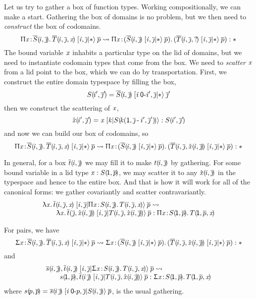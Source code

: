 \documentclass{article}
\begin{document}
Let us try to gather a box of function types. Working compositionally, we can make a
start. Gathering the box of domains is no problem, but we then need to \emph{construct}
the box of codomains.
\[
\xp{\vi,\jj}{\TY}{\PI\vx{\myv S\sv{\vi,\jj}}\myv T\sv{\vi,\jj,\vx}}\:\myv p \leadsto
  \PI\vx{(\xp{\vi,\jj}{\TY}{\myv S\sv{\vi,\jj}}\:\myv p)}
         (\xp{\vi,\jj}{\TY}{\myv T\sv{\vi,\jj,?}}\:\myv p) : \TY
\]
The bound variable $\vx$ inhabits a particular type on the lid of domains,
but we need to instantiate codomain types that come from the box. We need
to \emph{scatter} $\vx$ from a lid point to the box, which we can do by
transportation. First, we construct the entire domain typespace by filling
the box,
\[
S\sv{\vi',\jj'} = \xp{\vi\:\ra\pze\vi',\jj}{\TY}{\myv S\sv{\vi,\jj}}\:\jj'
\]
then we construct the scattering of $\vx$,
\[
\hat\vx\sv{\vi',\jj'} = \xp{\vk}{S\sv{\mux{\vk}{\pun,\jj\,}{\,\vi',\jj'}}}{\vx}
  : S\sv{\vi',\jj'}
\]
and now we can build our box of codomains, so
\[
\xp{\vi,\jj}{\TY}{\PI\vx{\myv S\sv{\vi,\jj}}\myv T\sv{\vi,\jj,\vx}}\:\myv p \leadsto
  \PI\vx{(\xp{\vi,\jj}{\TY}{\myv S\sv{\vi,\jj}}\:\myv p)}
         (\xp{\vi,\jj}{\TY}{\myv T\sv{\vi,\jj,\hat\vx\sv{\vi,\jj}}}\:\myv p) : \TY
\]

In general, for a box $\myv t\sv{\vi,\jj}$ we may
fill it to make $t\sv{\vi,\jj}$ by gathering. For some bound variable in a lid type
$\vx:S\sv{\pun,\myv p}$, we may scatter it to any $\hat\vx\sv{\vi,\jj}$ in the typespace
and hence to the entire box.
And that is how it will work for all of the canonical forms: we gather covariantly and scatter contravariantly.
\[\begin{array}{l}
\xp{\vi,\jj}{\PI\vx{S\sv{\vi,\jj}}T\sv{\vi,\jj,\vx}}{\la\vx\myv t\sv{\vi,\jj,\vx}}\:\myv p
 \leadsto \\ \qquad
  \la\vx \xp{\vi,\jj}{T\sv{\vi,\jj,\hat\vx\sv{\vi,\jj}}}
           {\myv t\sv{\,\jj,\hat\vx\sv{\vi,\jj}}}\:\myv p :
  \PI\vx{S\sv{\pun,\myv p}}T\sv{\pun,\myv p,\vx}
\end{array}\]

For pairs, we have
\[
\xp{\vi,\jj}{\TY}{\SG\vx{\myv S\sv{\vi,\jj}}\myv T\sv{\vi,\jj,\vx}}\:\myv p \leadsto
  \SG\vx{(\xp{\vi,\jj}{\TY}{\myv S\sv{\vi,\jj}}\:\myv p)}
         (\xp{\vi,\jj}{\TY}{\myv T\sv{\vi,\jj,\hat\vx\sv{\vi,\jj}}}\:\myv p) : \TY
\]
and
\[\begin{array}{l}
\xp{\vi,\jj}{\SG\vx{S\sv{\vi,\jj}}T\sv{\vi,\jj,\vx}}{\pa{\myv s\sv{\vi,\jj}}{\myv t\sv{\vi,\jj}}}\:\myv p
 \leadsto \\ \qquad
  \pa{s\sv{\pun,\myv p}}
  {\xp{\vi,\jj}{T\sv{\vi,\jj,\hat\vx\sv{\vi,\jj}}}
           {\myv t\sv{\vi\,\jj}}\:\myv p} :
  \SG\vx{S\sv{\pun,\myv p}}T\sv{\pun,\myv p,\vx}
\end{array}\]
where $s\sv{p,\myv p} = \xp{\vi\:\ra\pze p,\jj}{S\sv{\vi,\jj}}
           {\myv s\sv{\vi\,\jj}}\:\myv p$, is the usual gathering.
\end{document}

